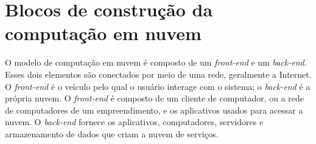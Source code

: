 \chapter{Blocos de construção da computação em nuvem}

\newcommand{\frontend}{\emph{front-end}\xspace}
\newcommand{\backend} {\emph{back-end}\xspace}

O modelo de computação em nuvem é composto de um \frontend e um \backend. Esses dois
elementos são conectados por meio de uma rede, geralmente a Internet. O \frontend é
o veículo pelo qual o usuário interage com o sistema; o \backend é a própria nuvem.
O \frontend é composto de um cliente de computador, ou a rede de computadores de um
empreendimento, e os aplicativos usados para acessar a nuvem. O \backend fornece os
aplicativos, computadores, servidores e armazenamento de dados que criam a nuvem de
serviços. 
